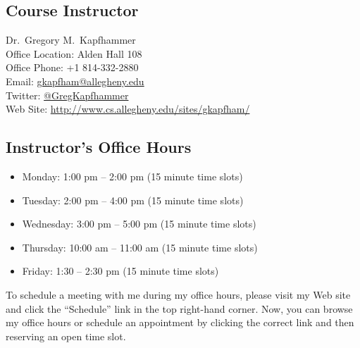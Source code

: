 

\usepackage{booktabs}
\renewcommand{\arraystretch}{1.2} 




\vspace*{-.2in}
\subsection*{Course Instructor}
Dr.\ Gregory M.\ Kapfhammer\\
\noindent Office Location: Alden Hall 108 \\
\noindent Office Phone: +1 814-332-2880 \\
\noindent Email: \url{gkapfham@allegheny.edu} \\
\noindent Twitter: \url{@GregKapfhammer} \\
\noindent Web Site: \url{http://www.cs.allegheny.edu/sites/gkapfham/}

\vspace*{-.1in}
\subsection*{Instructor's Office Hours}

\begin{itemize}
  \itemsep -.05em
  \item Monday: 1:00 pm -- 2:00 pm (15 minute time slots)
  \item Tuesday: 2:00 pm -- 4:00 pm (15 minute time slots)
  \item Wednesday: 3:00 pm -- 5:00 pm (15 minute time slots)
  \item Thursday: 10:00 am -- 11:00 am (15 minute time slots)
  \item Friday: 1:30 -- 2:30 pm (15 minute time slots)
\end{itemize}
\vspace*{-.1in}

\noindent
To schedule a meeting with me during my office hours, please visit my Web site and click the ``Schedule'' link
in the top right-hand corner. Now, you can browse my office hours or schedule an appointment by clicking the correct
link and then reserving an open time slot.

